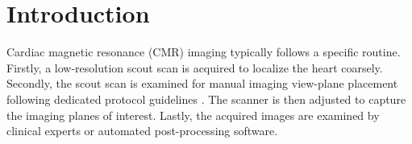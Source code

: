 \section{Introduction}
    \label{sec:introduction}
     Cardiac magnetic resonance (CMR) imaging typically follows a specific routine. Firstly, a low-resolution scout scan is acquired to localize the heart coarsely.
    Secondly, the scout scan is examined for manual imaging view-plane placement following dedicated protocol guidelines \cite{ismail2022cardiac}. The scanner is then adjusted to capture the imaging planes of interest. Lastly, the acquired images are examined by clinical experts or automated post-processing software.

